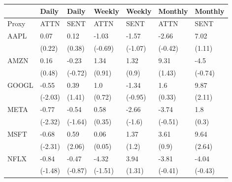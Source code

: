 \begin{tabular}{lllllll}
\toprule
{} &    Daily &    Daily &   Weekly &   Weekly &  Monthly &  Monthly \\
\midrule
Proxy &     ATTN &     SENT &     ATTN &     SENT &     ATTN &     SENT \\
AAPL  &     0.07 &     0.12 &    -1.03 &    -1.57 &    -2.66 &     7.02 \\
      &   (0.22) &   (0.38) &  (-0.69) &  (-1.07) &  (-0.42) &   (1.11) \\
AMZN  &     0.16 &    -0.23 &     1.34 &     1.32 &     9.31 &     -4.5 \\
      &   (0.48) &  (-0.72) &   (0.91) &    (0.9) &   (1.43) &  (-0.74) \\
GOOGL &    -0.55 &     0.39 &      1.0 &    -1.34 &      1.6 &     9.87 \\
      &  (-2.03) &   (1.41) &   (0.72) &  (-0.95) &   (0.33) &   (2.11) \\
META  &    -0.77 &    -0.54 &     0.58 &    -2.66 &    -3.74 &      1.8 \\
      &  (-2.32) &  (-1.64) &   (0.35) &   (-1.6) &  (-0.51) &    (0.3) \\
MSFT  &    -0.68 &     0.59 &     0.06 &     1.37 &     3.61 &     9.64 \\
      &  (-2.31) &   (2.06) &   (0.05) &    (1.2) &    (0.9) &   (2.64) \\
NFLX  &    -0.84 &    -0.47 &    -4.32 &     3.94 &    -3.81 &    -4.04 \\
      &  (-1.48) &  (-0.87) &  (-1.51) &   (1.31) &  (-0.41) &  (-0.43) \\
\bottomrule
\end{tabular}
